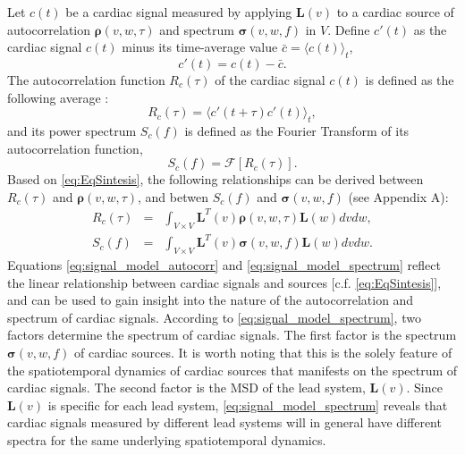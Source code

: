  Let $c(t)$ be a cardiac signal measured by applying $\mathbf{L}(v)$ to a
cardiac source of autocorrelation $\boldsymbol{\rho}(v,w,\tau)$  and spectrum
$\boldsymbol{\sigma}(v,w,f)$ in $V$. Define $c'(t)$ as the cardiac  signal
$c(t)$ minus its time-average value $\bar{c}=\langle c(t) \rangle_t$,
\begin{equation}\label{c_minus_average}
c'(t)=c(t)-\bar{c}.
\end{equation}
 The autocorrelation function $R_{c}(\tau)$ of the cardiac signal $c(t)$ is
defined as the following average \cite{Papoulis91}:
\begin{equation}\label{signal_autocorr}
R_{c}(\tau)  = \langle c'(t+\tau)c'(t) \rangle_t,
\end{equation}
 and its power spectrum $S_{c}(f)$ is defined as the Fourier Transform of its
autocorrelation function,
\begin{equation}\label{signal_spectrum}
S_{c}(f)  = \mathcal{F}[R_{c}(\tau)].
\end{equation}
 Based on \eqref{eq:EqSintesis}, the following relationships can be derived
between $R_{c}(\tau)$ and $\boldsymbol{\rho}(v,w,\tau)$, and betwen $S_{c}(f)$ and $\boldsymbol{\sigma}(v,w,f)$ (see Appendix A):
\begin{eqnarray}
R_{c}(\tau)&=& \int_{V\times V}{\mathbf{L}^{T}(v) \boldsymbol{\rho}(v,w,\tau) \mathbf{L}(w)}{dvdw},\label{eq:signal_model_autocorr}\\
S_{c}(f) &=&\int_{V\times V}{\mathbf{L}^{T}(v) \boldsymbol{\sigma}(v,w,f) \mathbf{L}(w)}{dv dw}. \label{eq:signal_model_spectrum}
\end{eqnarray}
 Equations \eqref{eq:signal_model_autocorr} and \eqref{eq:signal_model_spectrum}
 reflect the linear relationship between cardiac signals and sources [c.f.
 \eqref{eq:EqSintesis}], and can be used to gain insight into the nature of the
 autocorrelation and spectrum of cardiac signals. According to
 \eqref{eq:signal_model_spectrum}, two factors determine the spectrum of cardiac
 signals. The first factor is the spectrum $\boldsymbol{\sigma}(v,w,f)$ of
 cardiac sources. It is worth noting that this is the solely feature of the
 spatiotemporal dynamics of cardiac sources that manifests on the spectrum of
 cardiac signals. The second factor is the MSD of the lead system,
 $\mathbf{L}(v)$. Since $\mathbf{L}(v)$ is specific for each lead system,
 \eqref{eq:signal_model_spectrum} reveals that cardiac signals measured by
 different lead systems will in general have different spectra for the same
 underlying spatiotemporal dynamics.

